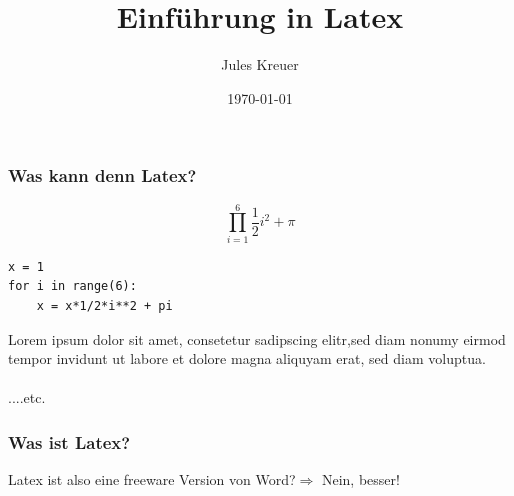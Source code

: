 \documentclass{beamer}
\title[]{Einführung in Latex} %
\author{Jules Kreuer} %
\institute[FSI] %
{
Uni Tübingen\\ %
\medskip
\textit{fsi@fsi.uni-tuebingen.de}\\
\textit{contact@juleskreuer.eu}\\
}
\date{\today} %
\begin{document}
\begin{frame}
\titlepage %
\end{frame}





\begin{frame}[fragile]
\frametitle{Was kann denn Latex?}
\[
\prod^6_{i=1} \frac{1}{2}i^2 + \pi
\]
\begin{verbatim}
x = 1
for i in range(6):
	x = x*1/2*i**2 + pi
\end{verbatim}
Lorem ipsum dolor sit amet, consetetur sadipscing elitr,sed diam nonumy eirmod tempor invidunt ut labore et dolore magna aliquyam erat, sed diam voluptua.\\\\
....etc.
\end{frame}

\begin{frame}
\frametitle{Was ist Latex?}
     Latex ist also eine freeware Version von Word?\pause $\Rightarrow$ Nein, besser!
     
\end{frame}
\end{document}
